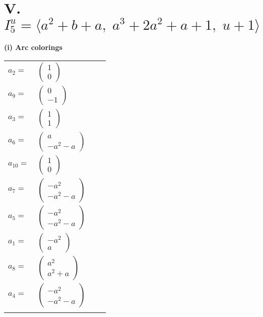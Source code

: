 \documentclass[1p]{elsarticle_modified}
\theoremstyle{definition}
\begin{document}
\centering \section*{V. $I^u_{5}= \langle a^2+b+a,\;a^3+2 a^2+a+1,\;u+1 \rangle$}
\flushleft \textbf{(i) Arc colorings}\\
\begin{tabular}{m{7pt} m{180pt} m{7pt} m{180pt} }
\flushright $a_{2}=$&$\begin{pmatrix}1\\0\end{pmatrix}$ \\
\flushright $a_{9}=$&$\begin{pmatrix}0\\-1\end{pmatrix}$ \\
\flushright $a_{3}=$&$\begin{pmatrix}1\\1\end{pmatrix}$ \\
\flushright $a_{6}=$&$\begin{pmatrix}a\\- a^2- a\end{pmatrix}$ \\
\flushright $a_{10}=$&$\begin{pmatrix}1\\0\end{pmatrix}$ \\
\flushright $a_{7}=$&$\begin{pmatrix}- a^2\\- a^2- a\end{pmatrix}$ \\
\flushright $a_{5}=$&$\begin{pmatrix}- a^2\\- a^2- a\end{pmatrix}$ \\
\flushright $a_{1}=$&$\begin{pmatrix}- a^2\\a\end{pmatrix}$ \\
\flushright $a_{8}=$&$\begin{pmatrix}a^2\\a^2+a\end{pmatrix}$ \\
\flushright $a_{4}=$&$\begin{pmatrix}- a^2\\- a^2- a\end{pmatrix}$\\&\end{tabular}
\end{document}
